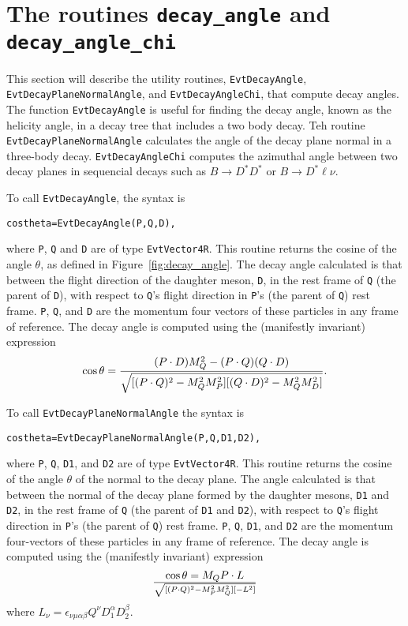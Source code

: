 \section{The routines {\tt decay\_angle} and {\tt decay\_angle\_chi}}
\label{sect:evtutil}

This section will describe the utility routines, 
{\tt EvtDecayAngle}, {\tt EvtDecayPlaneNormalAngle}, 
and  {\tt EvtDecayAngleChi},
that compute decay angles.  The function {\tt EvtDecayAngle} is 
useful for finding the decay angle, known as the helicity
angle, in a decay tree that includes a two body decay.
Teh routine {\tt EvtDecayPlaneNormalAngle} calculates the angle
of the decay plane normal in a three-body decay.
{\tt EvtDecayAngleChi} computes the azimuthal angle between two decay
planes in sequencial decays such as $B \rightarrow D^* D^*$ or
$B \rightarrow D^* \ell \nu$.

To call {\tt EvtDecayAngle}, the syntax is 
\begin{verbatim} 
costheta=EvtDecayAngle(P,Q,D),
\end{verbatim}
where {\tt P}, {\tt Q} and {\tt D} are of type {\tt EvtVector4R}.
This routine returns the cosine of the angle $\theta$, as defined in
Figure~\ref{fig:decay_angle}. The decay angle calculated is that between
the flight direction of the 
daughter meson, {\tt D}, in the rest frame of {\tt Q} (the parent of {\tt D}),
with respect to {\tt Q}'s
flight direction in {\tt P}'s (the parent of {\tt Q})
rest frame. {\tt P}, {\tt Q}, and {\tt D}
are the momentum four vectors of these particles in any frame of reference.
The decay angle is
computed using the (manifestly invariant) expression
\begin{equation}
\cos\theta = { {(P\cdot D) M^2_Q- (P\cdot Q)(Q\cdot D)} \over
        	      \sqrt{[(P\cdot Q)^2-M^2_QM^2_P]
		[(Q\cdot D)^2-M^2_QM^2_D]}}.
\end{equation}



To call {\tt EvtDecayPlaneNormalAngle} the syntax is 
\begin{verbatim} 
costheta=EvtDecayPlaneNormalAngle(P,Q,D1,D2),
\end{verbatim}
where {\tt P}, {\tt Q}, {\tt D1}, and {\tt D2} are of type {\tt EvtVector4R}.
This routine returns the cosine of the angle $\theta$ of the normal to the
decay plane.
 The angle calculated is that between
the normal of the decay plane formed by the 
daughter mesons, {\tt D1} and {\tt D2}, in the rest frame of {\tt Q} (the parent of {\tt D1} and {\tt D2}),
with respect to {\tt Q}'s
flight direction in {\tt P}'s (the parent of {\tt Q})
rest frame. {\tt P}, {\tt Q}, {\tt D1}, and {\tt D2}
are the momentum four-vectors of these particles in any frame of reference.
The decay angle is
computed using the (manifestly invariant) expression
\begin{equation}
\cos\theta = { M_QP\cdot L} \over
        	      \sqrt{[(P\cdot Q)^2-M^2_PM^2_Q]
		[-L^2]}
\end{equation}
where $L_{\nu}=\epsilon_{\nu\mu\alpha\beta}Q^{\nu}D_1^{\alpha}D_2^{\beta}$.




